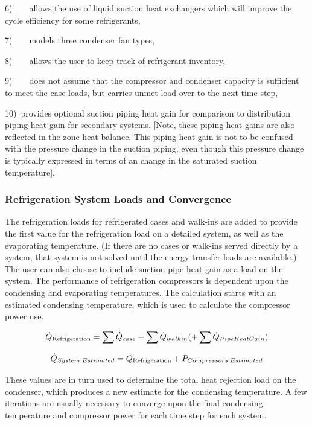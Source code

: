 6)~~~~allows the use of liquid suction heat exchangers which will improve the cycle efficiency for some refrigerants,

7)~~~~models three condenser fan types,

8)~~~~allows the user to keep track of refrigerant inventory,

9)~~~~does not assume that the compressor and condenser capacity is sufficient to meet the case loads, but carries unmet load over to the next time step,

10)~provides optional suction piping heat gain for comparison to distribution piping heat gain for secondary systems. {[}Note, these piping heat gains are also reflected in the zone heat balance. This piping heat gain is not to be confused with the pressure change in the suction piping, even though this pressure change is typically expressed in terms of an change in the saturated suction temperature{]}.

\subsubsection{Refrigeration System Loads and Convergence}\label{refrigeration-system-loads-and-convergence}

The refrigeration loads for refrigerated cases and walk-ins are added to provide the first value for the refrigeration load on a detailed system, as well as the evaporating temperature. (If there are no cases or walk-ins served directly by a system, that system is not solved until the energy transfer loads are available.) The user can also choose to include suction pipe heat gain as a load on the system. The performance of refrigeration compressors is dependent upon the condensing and evaporating temperatures. The calculation starts with an estimated condensing temperature, which is used to calculate the compressor power use.

\begin{equation}
{\dot Q_{{\rm{Refrigeration}}}} = \sum {{{\dot Q}_{case}}}  + \sum {{{\dot Q}_{walkin}}} ( + \sum {{{\dot Q}_{PipeHeatGain}}} )
\end{equation}

\begin{equation}
{\dot Q_{System,Estimated}} = {\dot Q_{{\rm{Refrigeration}}}} + {P_{Compressors,Estimated}}
\end{equation}

These values are in turn used to determine the total heat rejection load on the condenser, which produces a new estimate for the condensing temperature. A few iterations are usually necessary to converge upon the final condensing temperature and compressor power for each time step for each system.

